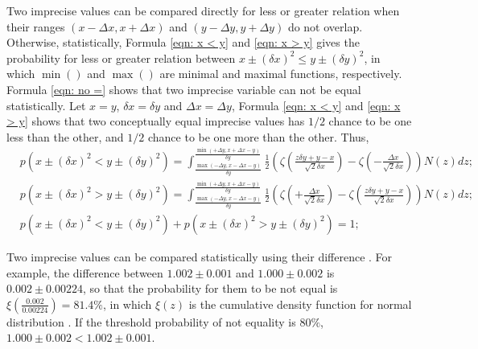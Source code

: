\documentclass[twoside]{article}
\numberwithin{equation}{section}
\begin{document}
Two imprecise values can be compared directly for less or greater relation when their ranges $(x - \Delta x, x + \Delta x)$ and $(y - \Delta y, y + \Delta y)$ do not overlap. 
Otherwise, statistically, Formula \eqref{eqn: x < y} and \eqref{eqn: x > y} gives the probability for less or greater relation between $x \pm (\delta x)^2 \le y \pm (\delta y)^2$, in which $\min()$ and $\max()$ are minimal and maximal functions, respectively.
Formula \eqref{eqn: no =} shows that two imprecise variable can not be equal statistically.
Let $x = y$, $\delta x = \delta y$ and $\Delta x = \Delta y$, Formula \eqref{eqn: x < y} and \eqref{eqn: x > y} shows that two conceptually equal imprecise values has $1/2$ chance to be one less than the other, and $1/2$ chance to be one more than the other.
Thus,
\begin{align}
\label{eqn: x < y}
& p\left( x \pm (\delta x)^2 < y \pm (\delta y)^2 \right) = 
  \int_{\frac{\max(-\Delta y, x - \Delta x - y)}{\delta y}}^{\frac{\min(+\Delta y, x + \Delta x - y)}{\delta y}} 
      \frac{1}{2} \left(\zeta(\frac{z \delta y + y - x}{\sqrt{2} \delta x}) - \zeta(-\frac{\Delta x}{\sqrt{2} \delta x})\right) N(z) d z; \\
\label{eqn: x > y}
& p\left( x \pm (\delta x)^2 > y \pm (\delta y)^2 \right) =     
  \int_{\frac{\max(-\Delta y, x - \Delta x - y)}{\delta y}}^{\frac{\min(+\Delta y, x + \Delta x - y)}{\delta y}} 
      \frac{1}{2} \left(\zeta(+\frac{\Delta x}{\sqrt{2} \delta x}) - \zeta(\frac{z \delta y + y - x}{\sqrt{2} \delta x})\right) N(z) d z; \\
\label{eqn: no =}
& p\left( x \pm (\delta x)^2 < y \pm (\delta y)^2 \right) + p\left( x \pm (\delta x)^2 > y \pm (\delta y)^2 \right) = 1;
\end{align}

\fi

Two imprecise values can be compared statistically using their difference \cite{Statistical_Methods}.
For example, the difference between $1.002 \pm 0.001$ and $1.000 \pm 0.002$ is $0.002 \pm 0.00224$, so that the probability for them to be not equal is $\xi(\frac{0.002}{0.00224}) = 81.4\%$, in which $\xi(z)$ is the cumulative density function for normal distribution \cite{Probability_Statistics}.
If the threshold probability of not equality is $80\%$, $1.000 \pm 0.002 < 1.002 \pm 0.001$.
\end{document}
